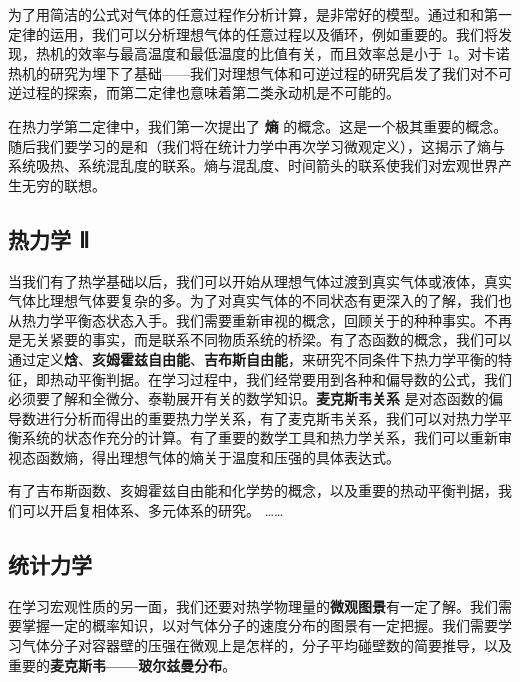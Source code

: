 为了用简洁的公式对气体的任意过程作分析计算，是非常好的模型。通过和和第一定律的运用，我们可以分析理想气体的任意过程以及循环，例如重要的。我们将发现，热机的效率与最高温度和最低温度的比值有关，而且效率总是小于 $1$。对卡诺热机的研究为埋下了基础——我们对理想气体和可逆过程的研究启发了我们对不可逆过程的探索，而第二定律也意味着第二类永动机是不可能的。

在热力学第二定律中，我们第一次提出了 \textbf{熵} 的概念。这是一个极其重要的概念。随后我们要学习的是和（我们将在统计力学中再次学习微观定义），这揭示了熵与系统吸热、系统混乱度的联系。熵与混乱度、时间箭头的联系使我们对宏观世界产生无穷的联想。

\subsection{热力学 Ⅱ}

当我们有了热学基础以后，我们可以开始从理想气体过渡到真实气体或液体，真实气体比理想气体要复杂的多。为了对真实气体的不同状态有更深入的了解，我们也从热力学平衡态状态入手。我们需要重新审视的概念，回顾关于的种种事实。不再是无关紧要的事实，而是联系不同物质系统的桥梁。有了态函数的概念，我们可以通过定义\textbf{焓}、\textbf{亥姆霍兹自由能}、\textbf{吉布斯自由能}，来研究不同条件下热力学平衡的特征，即热动平衡判据。在学习过程中，我们经常要用到各种和偏导数的公式，我们必须要了解和全微分、泰勒展开有关的数学知识。\textbf{麦克斯韦关系} 是对态函数的偏导数进行分析而得出的重要热力学关系，有了麦克斯韦关系，我们可以对热力学平衡系统的状态作充分的计算。有了重要的数学工具和热力学关系，我们可以重新审视态函数熵，得出理想气体的熵关于温度和压强的具体表达式。

有了吉布斯函数、亥姆霍兹自由能和化学势的概念，以及重要的热动平衡判据，我们可以开启复相体系、多元体系的研究。
……


\subsection{统计力学}

在学习宏观性质的另一面，我们还要对热学物理量的\textbf{微观图景}有一定了解。我们需要掌握一定的概率知识，以对气体分子的速度分布的图景有一定把握。我们需要学习气体分子对容器壁的压强在微观上是怎样的，分子平均碰壁数的简要推导，以及重要的\textbf{麦克斯韦——玻尔兹曼分布}。

